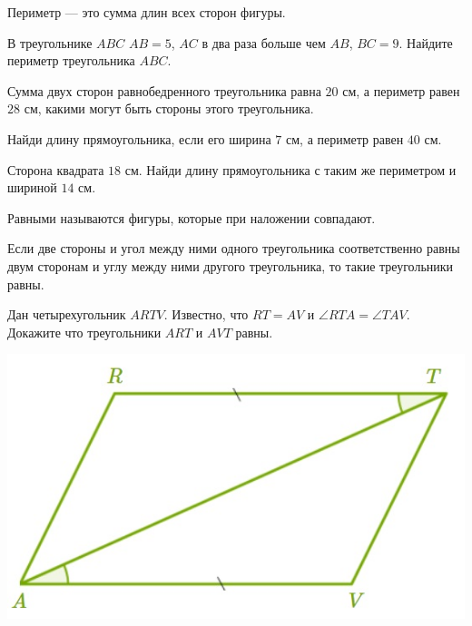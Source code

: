 %
%
\begin{class}[number=5]
	\begin{definit}
		Периметр --- это сумма длин всех сторон фигуры.
	\end{definit}
	\begin{listofex}
		\item В треугольнике \(ABC\) \(AB = 5\), \(AC\) в два раза больше чем \( AB \), \(BC = 9\). Найдите периметр треугольника \( ABC \).
		\item Сумма двух сторон равнобедренного треугольника равна \( 20 \) см, а периметр равен \( 28 \) см, какими могут быть стороны этого треугольника.
		\item Найди длину прямоугольника, если его ширина \(7\) см, а периметр равен \(40\) см.
		\item Сторона квадрата \(18\) см. Найди длину прямоугольника с таким же периметром и шириной \(14\) см.
	\end{listofex}
	\begin{definit}
		Равными называются фигуры, которые при наложении совпадают.
	\end{definit}
	\begin{definit}
		Если две стороны и угол между ними одного треугольника соответственно равны двум сторонам и углу между ними другого треугольника, то такие треугольники равны.
	\end{definit}
	\begin{listofex}[resume]
		\item
		\begin{minipage}[t]{0.63\linewidth}
			Дан четырехугольник \( ARTV \). Известно, что \( RT=AV \) и \( \angle RTA = \angle TAV \). Докажите что треугольники \( ART \) и \( AVT \) равны.
		\end{minipage}
		\hspace{0.03\linewidth}
		\begin{minipage}[c]{0.34\linewidth}
			\includegraphics[width=\linewidth]{pics/G71M4C5-3.jpg}

\end{minipage}
\end{listofex}
\end{class}
